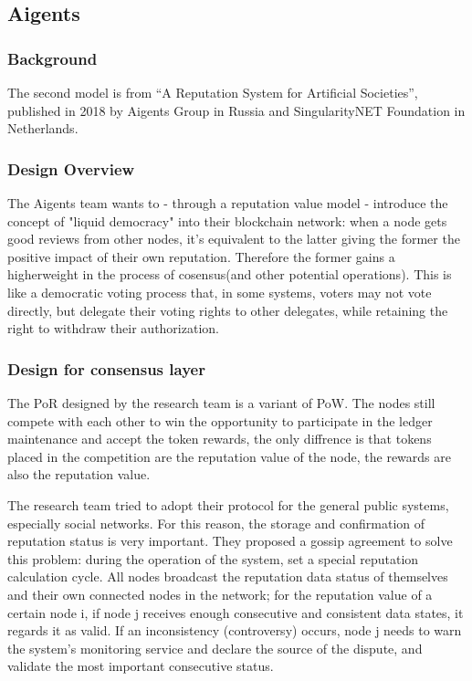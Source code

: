 \documentclass[doublespacing]{bmcart}
\begin{document}
\begin{CJK*}{UTF8}{gbsn}
	\subsection{Aigents} 
	\subsubsection*{Background}
	The second model is from ``A Reputation System for Artificial Societies'', published in 2018 by Aigents Group in Russia and SingularityNET Foundation in Netherlands.
	\subsubsection*{Design Overview}
	The Aigents team wants to - through a reputation value model - introduce the concept of "liquid democracy" into their blockchain network: when a node gets good reviews from other nodes, it's equivalent to the latter giving the former the positive impact of their own reputation. Therefore the former gains a higherweight in the process of cosensus(and other potential operations). This is like a democratic voting process that, in some systems, voters may not vote directly, but delegate their voting rights to other delegates, while retaining the right to withdraw their authorization.
	\subsubsection*{Design for consensus layer}  
	The PoR designed by the research team is a variant of PoW. The nodes still compete with each other to win the opportunity to participate in the ledger maintenance and accept the token rewards, the only diffrence is that tokens placed in the competition are the reputation value of the node, the rewards are also the reputation value.
	
	The research team tried to adopt their protocol for the general public systems, especially social networks. For this reason, the storage and confirmation of reputation status is very important. They proposed a gossip agreement to solve this problem: during the operation of the system, set a special reputation calculation cycle. All nodes broadcast the reputation data status of themselves and their own connected nodes in the network; for the reputation value of a certain node i, if node j receives enough consecutive and consistent data states, it regards it as valid. If an inconsistency (controversy) occurs, node j needs to warn the system's monitoring service and declare the source of the dispute, and validate the most important consecutive status.

\end{CJK*}
\end{document}
